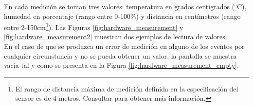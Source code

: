 \documentclass[12pt,a4paper, twoside]{report}
\begin{document}
	En cada medición se toman tres valores: temperatura en grados centígrados ($^{\circ}$C), humedad en porcentaje (rango entre 0-100\%) y distancia en centímetros (rango entre 2-150cm\footnote{El rango de distancia máxima de medición definida en la especificación del \gls{sensor} es de 4 metros. Consultar \cite{hcsr04:datasheet} para obtener más información.}). Las Figuras \ref{fig:hardware_measurement} y \ref{fig:hardware_measurement2} muestran dos ejemplos de lectura de valores. \\
	
%	
	
	En el caso de que se produzca un error de medición en alguno de los eventos por cualquier circunstancia y no se pueda obtener un valor, la pantalla se muestra vacía tal y como se presenta en la Figura \ref{fig:hardware_measurement_empty}.
	
	\newpage
	
	
\end{document}
